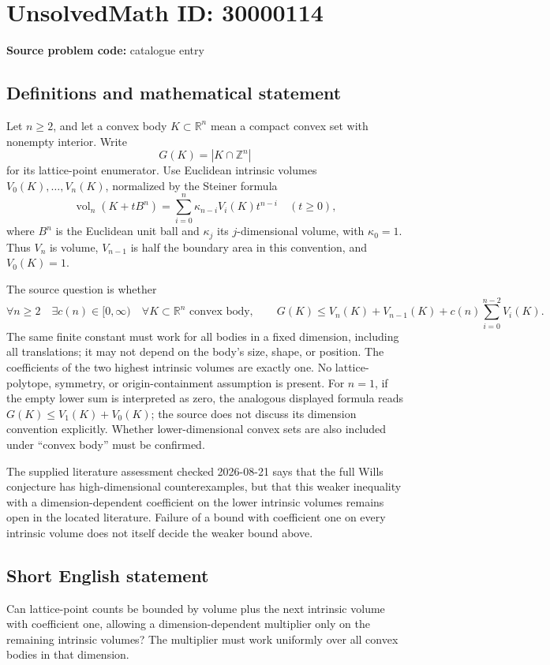 \documentclass[11pt]{article}
\newcommand{\Z}{\mathbb{Z}}
\newcommand{\R}{\mathbb{R}}
\begin{document}
\section*{UnsolvedMath ID: 30000114}
\textbf{Source problem code:} catalogue entry
\subsection{Definitions and mathematical statement}
Let \(n\geq2\), and let a convex body \(K\subset\R^n\) mean a compact convex set with nonempty interior. Write
\[
G(K)=|K\cap\Z^n|
\]
for its lattice-point enumerator. Use Euclidean intrinsic volumes \(V_0(K),\ldots,V_n(K)\), normalized by the Steiner formula
\[
\operatorname{vol}_n(K+tB^n)=\sum_{i=0}^n\kappa_{n-i}V_i(K)t^{n-i}\quad(t\geq0),
\]
where \(B^n\) is the Euclidean unit ball and \(\kappa_j\) its \(j\)-dimensional volume, with \(\kappa_0=1\). Thus \(V_n\) is volume, \(V_{n-1}\) is half the boundary area in this convention, and \(V_0(K)=1\).

The source question is whether
\[
\forall n\geq2\quad\exists c(n)\in[0,\infty)\quad
\forall K\subset\R^n\text{ convex body},\qquad
G(K)\leq V_n(K)+V_{n-1}(K)+c(n)\sum_{i=0}^{n-2}V_i(K).
\]
The same finite constant must work for all bodies in a fixed dimension, including all translations; it may not depend on the body's size, shape, or position. The coefficients of the two highest intrinsic volumes are exactly one. No lattice-polytope, symmetry, or origin-containment assumption is present. For \(n=1\), if the empty lower sum is interpreted as zero, the analogous displayed formula reads \(G(K)\leq V_1(K)+V_0(K)\); the source does not discuss its dimension convention explicitly. Whether lower-dimensional convex sets are also included under ``convex body'' must be confirmed.

The supplied literature assessment checked 2026-08-21 says that the full Wills conjecture has high-dimensional counterexamples, but that this weaker inequality with a dimension-dependent coefficient on the lower intrinsic volumes remains open in the located literature. Failure of a bound with coefficient one on every intrinsic volume does not itself decide the weaker bound above.
\subsection{Short English statement}
Can lattice-point counts be bounded by volume plus the next intrinsic volume with coefficient one, allowing a dimension-dependent multiplier only on the remaining intrinsic volumes? The multiplier must work uniformly over all convex bodies in that dimension.
\end{document}
